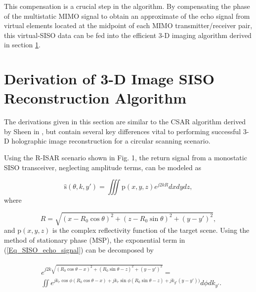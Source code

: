 \documentclass[conference]{IEEEtran}
\begin{document}
		This compensation is a crucial step in the algorithm. By compensating the phase of the multistatic MIMO signal to obtain an approximate of the echo signal from virtual elements located at the midpoint of each MIMO transmitter/receiver pair, this virtual-SISO data can be fed into the efficient 3-D imaging algorithm derived in section \ref{sec:derivation_3D_siso_algorithm}.
		
		\section{Derivation of 3-D Image SISO Reconstruction Algorithm}
		\label{sec:derivation_3D_siso_algorithm}
			
		The derivations given in this section are similar to the CSAR algorithm derived by Sheen in \cite{Sheen:CSARPatent}, but contain several key differences vital to performing successful 3-D holographic image reconstruction for a circular scanning scenario.
		
		Using the R-ISAR scenario shown in Fig. 1, the return signal from a monostatic SISO transceiver, neglecting amplitude terms, can be modeled as
		
		\begin{equation}
		\hat{\text{s}}(\theta,k,y') = \iiint \text{p}(x,y,z) e^{j2kR} dx dy dz,
		\label{Eq_SISO_echo_signal}
		\end{equation}
		where
		
		\begin{equation}
		R = \sqrt{(x - R_0\cos\theta)^2 +  (z - R_0\sin\theta)^2 + (y - y')^2},
		\end{equation}
		and $\text{p}(x,y,z)$ is the complex reflectivity function of the target scene. Using the method of stationary phase (MSP), the exponential term in (\ref{Eq_SISO_echo_signal}) can be decomposed by
		
		\begin{align}
		\begin{split}
		&e^{j2k\sqrt{(R_0\cos\theta - x)^2 + (R_0\sin\theta - z)^2 + (y - y')^2}} = \\ 
		&\iint e^{jk_r\cos\phi(R_0\cos\theta - x) + jk_r\sin\phi(R_0\sin\theta - z) + jk_{y'}(y-y'))} d\phi dk_{y'}.
		\end{split}
		\label{Eq_MSP_step}
		\end{align}
		
\end{document}
